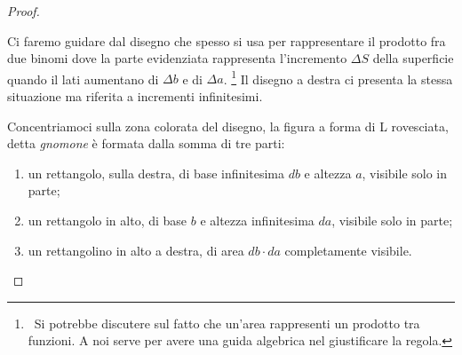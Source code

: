 
\begin{proof}
~

\vspace{-.5em}
\begin{inaccessibleblock}
\end{inaccessibleblock}
\label{fig:Incre_prodotto}

Ci faremo guidare dal disegno che spesso si usa per rappresentare il 
prodotto fra due binomi dove la parte evidenziata rappresenta l'incremento 
\(\Delta S\) della superficie quando il lati aumentano di \(\Delta b\) e di 
\(\Delta a\). 
\footnote{~Si potrebbe discutere sul fatto che 
un'area rappresenti un prodotto tra funzioni. 
A noi serve per avere una guida algebrica nel giustificare la regola.}
Il disegno a destra ci presenta la stessa situazione ma riferita a incrementi 
infinitesimi.

Concentriamoci sulla zona colorata del disegno, la figura a forma 
di L rovesciata, detta \emph{gnomone} è formata dalla somma di tre parti:
\begin{enumerate} [nosep]
\item un rettangolo, sulla destra, di base
infinitesima \(db\) e altezza \(a\), visibile solo in parte;
\item un rettangolo in alto, di base \(b\) e
altezza infinitesima \(da\), visibile solo in parte;
\item un rettangolino in alto a destra, di area \(db \cdot da\) 
completamente visibile.
\end{enumerate}


\end{proof}
